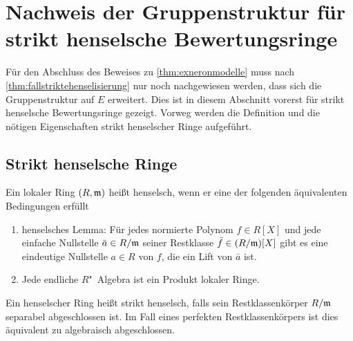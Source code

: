 \section[Gruppenstruktur für strikt henselsche Ringe]%
{Nachweis der Gruppenstruktur für strikt henselsche Bewertungsringe}
\label{chap:gruppestrikthenselsch}
Für den Abschluss des Beweises zu \ref{thm:exneronmodelle} muss
nach \ref{thm:fallstriktehenselisierung} nur noch nachgewiesen werden,
dass sich die Gruppenstruktur auf $E$ erweitert.
Dies ist in diesem Abschnitt vorerst für strikt henselsche
Bewertungsringe gezeigt. Vorweg werden die Definition und die nötigen
Eigenschaften strikt henselscher Ringe aufgeführt.
\subsection{Strikt henselsche Ringe}
\begin{Definition}\label{def:henselscheringe}
  Ein lokaler Ring $(R,\mathfrak{m})$ heißt henselsch, wenn
  er eine der folgenden äquivalenten Bedingungen erfüllt
  \begin{enumerate}[label=(\roman*)]
  \item henselsches Lemma:
    Für jedes normierte Polynom $f\in R[X]$ und jede einfache Nullstelle
    $\bar a\in R/\mathfrak{m}$ seiner Restklasse $\bar f\in (R/\mathfrak{m})[X]$
    gibt es eine eindeutige Nullstelle ${a\in R}$ von $f$, die ein Lift
    von $\bar a$ ist.
  \item Jede endliche $R$"~Algebra ist ein Produkt lokaler Ringe.
  \end{enumerate}
  Ein henselscher Ring heißt strikt henselsch, falls sein
  Restklassenkörper $R/\mathfrak{m}$ separabel abgeschlossen ist.
  Im Fall eines perfekten Restklassenkörpers ist dies äquivalent zu
  algebraisch abgeschlossen.
\end{Definition}

  

